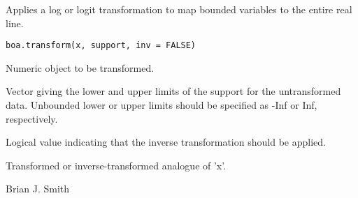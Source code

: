 \begin{Description}\relax
Applies a log or logit transformation to map bounded variables to the entire 
real line.
\end{Description}
\begin{Usage}
\begin{verbatim}
boa.transform(x, support, inv = FALSE)
\end{verbatim}
\end{Usage}
\begin{Arguments}
\begin{ldescription}
\item[\code{x}] Numeric object to be transformed.
\item[\code{support}] Vector giving the lower and upper limits of the support for 
the untransformed data. Unbounded lower or upper limits should be specified 
as -Inf or Inf, respectively.
\item[\code{inv}] Logical value indicating that the inverse transformation should be 
applied.
\end{ldescription}
\end{Arguments}
\begin{Value}
Transformed or inverse-transformed analogue of 'x'.
\end{Value}
\begin{Author}\relax
Brian J. Smith
\end{Author}

